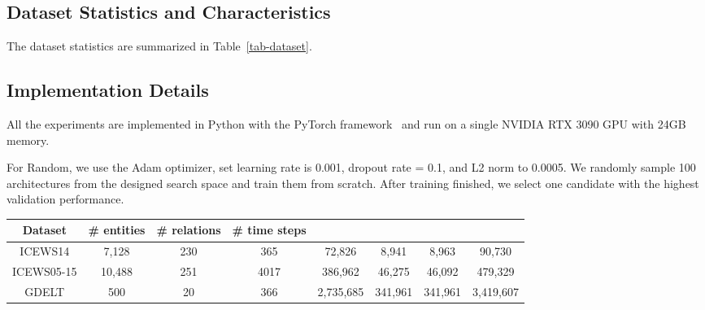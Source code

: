\documentclass[11pt]{article}
\begin{document}
\subsection{Dataset Statistics and Characteristics}
\label{sec:appendix-dataset}

The dataset statistics are summarized in Table~\ref{tab-dataset}.

\subsection{Implementation Details}
\label{sec:appendix-impl}

All the experiments are implemented in Python with the PyTorch framework~\citep{paszke2019pytorch} and run on a single NVIDIA RTX 3090 GPU with 24GB memory.

For Random, 
we use the Adam optimizer, 
set learning rate is 0.001, 
dropout rate = 0.1, and L2 norm to 0.0005.
We randomly sample 100 architectures from the designed search space and train them from scratch.   
After training finished, 
we select one candidate with the highest validation performance.

\begin{table*}[!h]
	\centering
	\begin{tabular}{cccccccc}
		\toprule
		\textbf{Dataset} &\textbf{\# entities} & \textbf{\# relations} &\textbf{\# time steps} &\multicolumn{1}{c}{\bm{}}   & \multicolumn{1}{c}{\bm{}} & \multicolumn{1}{c}{\bm{}} & \multicolumn{1}{c}{\bm{}}\\
		\midrule
		ICEWS14 & 7,128 &230 &365 &72,826 &8,941 &8,963 &90,730 \\
		ICEWS05-15 & 10,488 & 251 & 4017 & 386,962 & 46,275 & 46,092 & 479,329 \\
		GDELT & 500 & 20 & 366 & 2,735,685 & 341,961 & 341,961 &3,419,607 \\
		\bottomrule
	\end{tabular}
	\caption{Statistics of ICEWS14, ICEWS05-15 and GDELT datasets. }
	\label{tab-dataset}
\end{table*}
\end{document}
